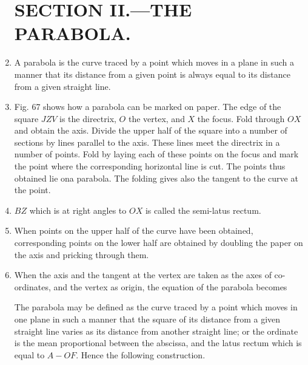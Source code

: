 \begin{enumerate}


\section{SECTION II.—THE PARABOLA.}


\item A parabola is the curve traced by a point which moves in a plane in such a
    manner that its distance from a given point is always equal to its distance
    from a given straight line.


\item Fig. 67 shows how a parabola can be marked on paper. The edge of the
    square $JZV$ is the directrix, $O$ the vertex, and $X$ the focus. Fold
    through $OX$ and obtain the axis. Divide the upper half of the square into a
    number of sections by lines parallel to the axis. These lines meet the
    directrix in a number of points. Fold by laying each of these points on the
    focus and mark the point where the corresponding horizontal line is cut. The
    points thus obtained lie ona parabola. The folding gives also the tangent to
    the curve at the point.

%

\item $BZ$ which is at right angles to $OX$ is called the semi-latus rectum.


\item When points on the upper half of the curve have been obtained,
    corresponding points on the lower half are obtained by doubling the paper on
    the axis and pricking through them.


\item When the axis and the tangent at the vertex are taken as the axes of
    co-ordinates, and the vertex as origin, the equation of the parabola
    becomes

%
%

    The parabola may be defined as the curve traced by a point which moves in
    one plane in such a manner that the square of its distance from a given
    straight line varies as its distance from another straight line; or the
    ordinate is the mean proportional between the abscissa, and the latus rectum
    which is equal to $A-OF$. Hence the following construction.


\end{enumerate}
